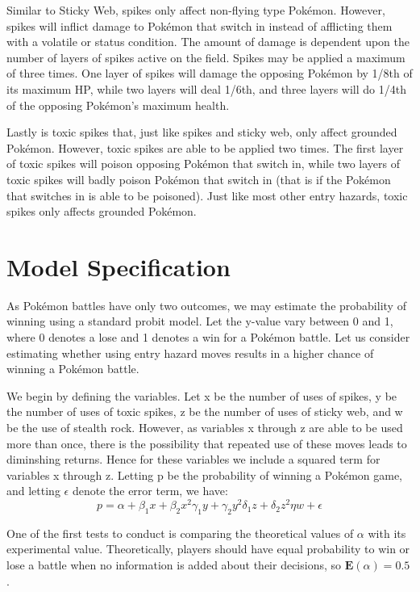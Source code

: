\documentclass[12pt,twoside]{reedthesis}
\begin{document}
  Similar to Sticky Web, spikes only affect non-flying type Pokémon.
  However, spikes will inflict damage to Pokémon that switch in instead of
  afflicting them with a volatile or status condition. The amount of
  damage is dependent upon the number of layers of spikes active on the
  field. Spikes may be applied a maximum of three times. One layer of
  spikes will damage the opposing Pokémon by 1/8th of its maximum HP,
  while two layers will deal 1/6th, and three layers will do 1/4th of the
  opposing Pokémon's maximum health.
  
  Lastly is toxic spikes that, just like spikes and sticky web, only
  affect grounded Pokémon. However, toxic spikes are able to be applied
  two times. The first layer of toxic spikes will poison opposing Pokémon
  that switch in, while two layers of toxic spikes will badly poison
  Pokémon that switch in (that is if the Pokémon that switches in is able
  to be poisoned). Just like most other entry hazards, toxic spikes only
  affects grounded Pokémon.
  
  \section{Model Specification}\label{model-specification}
  
  As Pokémon battles have only two outcomes, we may estimate the
  probability of winning using a standard probit model. Let the y-value
  vary between 0 and 1, where 0 denotes a lose and 1 denotes a win for a
  Pokémon battle. Let us consider estimating whether using entry hazard
  moves results in a higher chance of winning a Pokémon battle.
  
  We begin by defining the variables. Let x be the number of uses of
  spikes, y be the number of uses of toxic spikes, z be the number of uses
  of sticky web, and w be the use of stealth rock. However, as variables x
  through z are able to be used more than once, there is the possibility
  that repeated use of these moves leads to diminshing returns. Hence for
  these variables we include a squared term for variables x through z.
  Letting p be the probability of winning a Pokémon game, and letting
  \(\epsilon\) denote the error term, we have:
  \[p = \alpha + \beta_1 x + \beta_2 x^2 \gamma_1 y + \gamma_2 y^2 \delta_1 z + \delta_2 z^2 \eta w + \epsilon \]
  
  One of the first tests to conduct is comparing the theoretical values of
  \(\alpha\) with its experimental value. Theoretically, players should
  have equal probability to win or lose a battle when no information is
  added about their decisions, so \(\mathbf{E}(\alpha)=0.5\).
  
\end{document}
